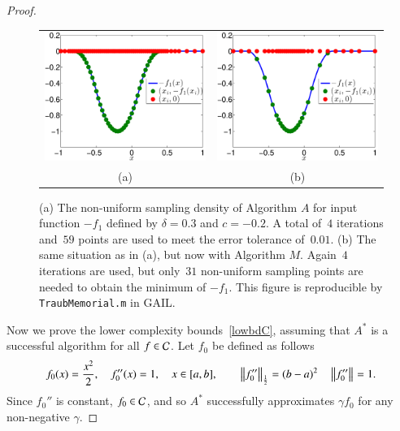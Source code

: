 \documentclass[review]{elsarticle}
\theoremstyle{definition}
\begin{document}
\begin{proof}
\begin{figure}[t]
\begin{tabular}{cc}	
		 \includegraphics[width=5.7cm]{figure/sampling-funappxg.eps}
		&\includegraphics[width=5.7cm]{figure/sampling-funming.eps}
		\\ (a) & (b)
		\end{tabular}
		\caption{(a) The non-uniform sampling density of Algorithm $A$ for input function
$-f_1$ defined by $\delta = 0.3$ and $c = -0.2$. A total of~$4$ iterations
and~$59$ points are used to meet the error tolerance of~$0.01$. 
(b) The same situation as in (a), but now
with Algorithm $M$. Again~$4$ iterations are used, but only~$31$ non-uniform
sampling points are needed to obtain the minimum of $-f_1$.  
This figure is reproducible by \texttt{TraubMemorial.m}
		in GAIL.}
		\label{f3foolplot}
\end{figure}
  
	Now we prove the lower complexity bounds~\eqref{lowbdC}, assuming that $A^*$ is
	a successful algorithm for all $f \in \mathcal{C}$. Let $f_0$ be defined as follows
	\begin{equation}
	\label{assumpfzero}
	f_0(x) =\frac{x^2}{2}, \quad f_0''(x) = 1, \quad x \in [a,b], \qquad \norm[\frac12]{f_0''} = (b -a)^2  \quad \norm{f_0''} = 1.
	\end{equation}
	Since $f_0''$ is constant, $f_0 \in \mathcal{C}$, and so $A^*$ successfully approximates
	$\gamma f_0$ for any non-negative $\gamma$.
	

\end{proof}
\end{document}
